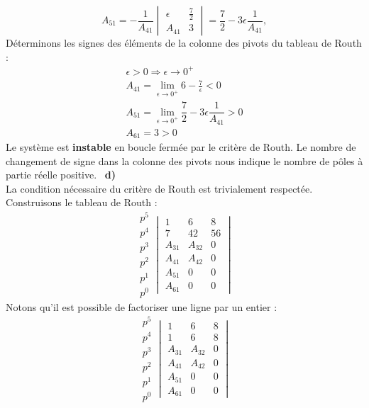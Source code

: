 \[
A_{51}=-\dfrac{1}{A_{41}}
       \begin{vmatrix}
       \epsilon & \frac{7}{2} \\
        A_{41}&3
       \end{vmatrix}
      =\dfrac{7}{2}-3\epsilon\dfrac{1}{A_{41}},
\]
Déterminons les signes des éléments de la colonne des pivots
du tableau de Routh :
\begin{align*}
\epsilon >0 \Rightarrow \epsilon\rightarrow0^+ \\
    A_{41}=\lim\limits_{\epsilon\rightarrow 0^+}6-\frac{7}{\epsilon} <0  \\
    A_{51}=\lim\limits_{\epsilon\rightarrow 0^+}
    \dfrac{7}{2}-3\epsilon\dfrac{1}{A_{41}} >0 \\
    A_{61}=3 > 0
\end{align*}
Le système est \textbf{instable} en boucle fermée par le critère de Routh.
Le nombre de changement de signe dans la colonne des pivots nous indique le 
nombre de pôles à partie réelle positive.
\noindent~\textbf{d)}\\
La condition nécessaire du critère de Routh est trivialement respectée.
Construisons le tableau de Routh :
\[
\begin{matrix}
    p^5 \\[1em]
    p^4 \\[1em]
    \hline
    p^3 \\[1em]
    p^2 \\[1em]
    p^1 \\[1em]
    p^0 
\end{matrix}
\begin{vmatrix}
    1  & 6   & 8 \\[1em]
    7  & 42  & 56 \\[1em] 
    \hline
    A_{31} & A_{32} & 0\\[1em]
    A_{41} & A_{42} & 0\\[1em]
    A_{51} & 0      & 0\\[1em]
    A_{61} & 0 & 0
\end{vmatrix}
\]
Notons qu'il est possible de factoriser une ligne par un entier :
\[
\begin{matrix}
    p^5 \\[1em]
    p^4 \\[1em]
    \hline
    p^3 \\[1em]
    p^2 \\[1em]
    p^1 \\[1em]
    p^0 
\end{matrix}
\begin{vmatrix}
    1  & 6   & 8 \\[1em]
    1  & 6   & 8 \\[1em] 
    \hline
    A_{31} & A_{32} & 0\\[1em]
    A_{41} & A_{42} & 0\\[1em]
    A_{51} & 0      & 0\\[1em]
    A_{61} & 0 & 0
\end{vmatrix}
\]
